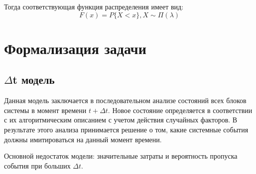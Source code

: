 Тогда соответствующая функция распределения имеет вид:
\begin{equation}
    F(x) = P\{X < x\}, X \sim \Pi(\lambda)
\end{equation}

\section{Формализация задачи}

\subsection{$\Delta$t модель}

Данная модель заключается в последовательном анализе состояний всех блоков системы в момент времени $t + \Delta t$. Новое состояние определяется в соответствии с их алгоритмическим описанием с учетом действия случайных факторов. В результате этого анализа принимается решение о том, какие системные события должны имитироваться на данный момент времени. 

Основной недостаток модели: значительные затраты и вероятность пропуска события при больших $\Delta t$.
